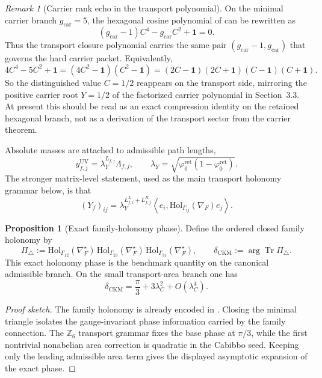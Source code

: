 \documentclass[11pt,a4paper]{article}
\theoremstyle{definition}
\newtheorem{proposition}[theorem]{Proposition}
\theoremstyle{remark}
\newtheorem*{remark}{Remark}
\DeclareMathOperator{\tr}{Tr}
\newcommand{\phiz}{\varphi_0^{\mathrm{ret}}}
\newcommand{\lambdaY}{\lambda_Y}
\newcommand{\gcar}{g_{\mathrm{car}}}
\begin{document}
\begin{remark}[Carrier rank echo in the transport polynomial]\label{rem:transport-rank-echo}
On the minimal carrier branch $\gcar=5$, the hexagonal cosine polynomial of  can be rewritten as
\[
(\gcar-1)C^4-\gcar C^2+\mathbf 1=0.
\]
Thus the transport closure polynomial carries the same pair $(\gcar-1,\gcar)$ that governs the hard carrier packet. Equivalently,
\[
4C^4-5C^2+\mathbf 1=(4C^2-\mathbf 1)(C^2-\mathbf 1)=(2C-\mathbf 1)(2C+\mathbf 1)(C-\mathbf 1)(C+\mathbf 1).
\]
So the distinguished value $C=1/2$ reappears on the transport side, mirroring the positive carrier root $Y=1/2$ of the factorized carrier polynomial in Section~3.3. At present this should be read as an exact compression identity on the retained hexagonal branch, not as a derivation of the transport sector from the carrier theorem.
\end{remark}

Absolute masses are attached to admissible path lengths,
\begin{equation}
\label{eq:path-length-yukawa}
y_{f,j}^{\mathrm{UV}}=\lambdaY^{L_{f,j}}\Lambda_{f,j},
\qquad
\lambdaY=\sqrt{\phiz(1-\phiz)}.
\end{equation}
The stronger matrix-level statement, used as the main transport holonomy grammar below, is that
\begin{equation}
\label{eq:yukawa-holonomy-matrix}
(Y_f)_{ij}
=
\lambdaY^{L^L_{f,i}+L^R_{f,j}}
\left\langle e_i,\mathrm{Hol}_{\Gamma_{ij}}(\nabla_F)e_j\right\rangle.
\end{equation}
\begin{proposition}[Exact family-holonomy phase]
\label{prop:holonomy-triangle-phase}
\label{prop:exact-family-holonomy-phase}
Define the ordered closed family holonomy by
\[
\Pi_\triangle
:=
\mathrm{Hol}_{\Gamma_{12}}(\nabla_F^\star)\,
\mathrm{Hol}_{\Gamma_{23}}(\nabla_F^\star)\,
\mathrm{Hol}_{\Gamma_{31}}(\nabla_F^\star),
\qquad
\delta_{\mathrm{CKM}}
:=
\arg\tr\Pi_\triangle.
\]
This exact holonomy phase is the benchmark quantity on the canonical admissible branch. On the
small transport-area branch one has
\begin{equation}
\label{eq:ckm-holonomy-phase}
\delta_{\mathrm{CKM}}
=
\frac{\pi}{3}+3\lambda_C^2+O(\lambda_C^4).
\end{equation}
\end{proposition}

\begin{proof}[Proof sketch]
The family holonomy is already encoded in . Closing the
minimal triangle isolates the gauge-invariant phase information carried by the family
connection. The $\mathbb Z_6$ transport grammar fixes the base phase at $\pi/3$, while the
first nontrivial nonabelian area correction is quadratic in the Cabibbo seed. Keeping only the
leading admissible area term gives the displayed asymptotic expansion of the exact phase.
\end{proof}
\end{document}
